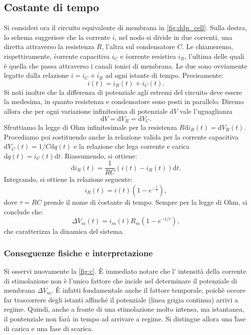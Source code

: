 \subsection{Costante di tempo}
Si consideri ora il circuito equivalente di membrana in \autoref{fig:ddp_cell}. Sulla destra, lo schema suggerisce che la corrente $i$, nel nodo si divide in due correnti, una diretta attraverso la resistenza $R$, l'altra sul condensatore $C$. Le chiameremo, rispettivamente, \h{corrente capacitiva} $i_C$ e \h{corrente resistiva} $i_R$, l'ultima delle quali è quella che passa attraverso i canali ionici di membrana. Le due sono ovviamente legatte dalla relazione $i = i_C + i_R$ ad ogni istante di tempo. Precisamente:
\begin{equation*}
    i(t) = i_R(t) + i_C(t).
\end{equation*}
Si noti inoltre che la differenza di potenziale agli estremi del circuito deve essere la medesima, in quanto resistenza e condensatore sono posti in parallelo. Diremo allora che per ogni variazione infinitesima di potenziale $\mathrm{d}V$ vale l'uguaglianza
\begin{equation*}
    \mathrm{d}V = \mathrm{d}V_R = \mathrm{d}V_C.
\end{equation*}
Sfruttiamo la legge di Ohm infinitesimale per la resistenza $R \mathrm{d} i_R(t) = \mathrm{d} V_R (t)$. Procediamo poi sostituendo anche la relazione valida per la corrente capacitiva $\mathrm{d} V_C(t) = 1/C \mathrm{d} q(t)$ e la relazione che lega corrente e carica $\mathrm{d} q(t) = i_C(t) \mathrm{d} t$. Riassumendo, si ottiene:
\begin{equation*}
    \mathrm{d} i_R(t) = \frac{1}{RC} \left(i(t) - i_R(t)\right) \mathrm{d}t.
\end{equation*}
Integrando, si ottiene la relazione seguente:
\begin{equation*}
    i_R(t) = i(t) \left(1- e^{-\frac{t}{\tau}}\right),
\end{equation*}
dove $\tau = RC$ prende il nome di \h{costante di tempo}. Sempre per la legge di Ohm, si conclude che:
\begin{equation*}
    \Delta V_m (t) =  i_m (t) R_m \left(1-e^{-t/\tau}\right),
\end{equation*}
che caratterizza la dinamica del sistema. 

\subsubsection{Conseguenze fisiche e interpretazione}
Si osservi nuovamente la \autoref{fig:c}. È immediato notare che l' intensità della corrente di stimolazione non è l'unico fattore che incide nel determinare il potenziale di membrana $\Delta V_m$. È infatti fondamentale anche il fattore temporale, poichè occore far trascorrere degli istanti affinché il potenziale (linea grigia continua) arrivi a regime. Quindi, anche a fronte di una stimolazione molto intensa, ma istantanea, il pontenziale non farà in tempo ad arrivare a regime. Si distingue allora una \h{fase di carica} e una \h{fase di scarica}.

